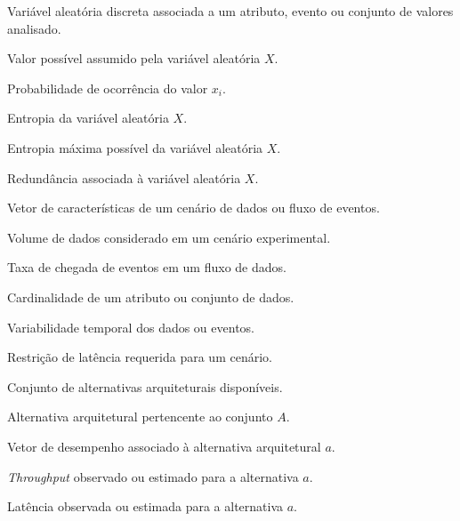 \begin{simbolos}
   
\item[$X$] Variável aleatória discreta associada a um atributo, evento ou conjunto de valores analisado.

\item[$x_i$] Valor possível assumido pela variável aleatória $X$.

\item[$p(x_i)$] Probabilidade de ocorrência do valor $x_i$.

\item[$H(X)$] Entropia da variável aleatória $X$.

\item[$H_{max}(X)$] Entropia máxima possível da variável aleatória $X$.

\item[$R(X)$] Redundância associada à variável aleatória $X$.

\item[$C_D$] Vetor de características de um cenário de dados ou fluxo de eventos.

\item[$V$] Volume de dados considerado em um cenário experimental.

\item[$\lambda$] Taxa de chegada de eventos em um fluxo de dados.

\item[$K$] Cardinalidade de um atributo ou conjunto de dados.

\item[$\sigma$] Variabilidade temporal dos dados ou eventos.

\item[$L_{req}$] Restrição de latência requerida para um cenário.

\item[$A$] Conjunto de alternativas arquiteturais disponíveis.

\item[$a$] Alternativa arquitetural pertencente ao conjunto $A$.

\item[$P_a$] Vetor de desempenho associado à alternativa arquitetural $a$.

\item[$T_a$] \textit{Throughput} observado ou estimado para a alternativa $a$.

\item[$L_a$] Latência observada ou estimada para a alternativa $a$.


\end{simbolos}
